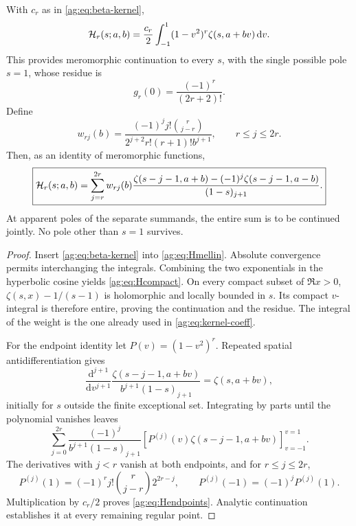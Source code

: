 \begin{theorem}
\label{ag:thm:hurwitz}
With $c_r$ as in \eqref{ag:eq:beta-kernel},
\begin{equation}\label{ag:eq:Hcompact}
 \mathcal H_r(s;a,b)=\frac{c_r}{2}\int_{-1}^1
                    (1-v^2)^r\zeta(s,a+bv)\,\mathrm d v.
\end{equation}
This provides meromorphic continuation to every $s$, with the single
possible pole $s=1$, whose residue is
\begin{equation}\label{ag:eq:Hresidue}
 g_r(0)=\frac{(-1)^r}{(2r+2)!}.
\end{equation}
Define
\begin{equation}\label{ag:eq:weights}
 w_{rj}(b)=\frac{(-1)^j j!\binom r{j-r}}
 {2^{j+2}r!(r+1)!b^{j+1}},\qquad r\le j\le2r.
\end{equation}
Then, as an identity of meromorphic functions,
\begin{equation}\label{ag:eq:Hendpoints}
 \boxed{
 \mathcal H_r(s;a,b)=\sum_{j=r}^{2r}w_{rj}(b)
 \frac{\zeta(s-j-1,a+b)-(-1)^j\zeta(s-j-1,a-b)}{(1-s)_{j+1}}.}
\end{equation}
At apparent poles of the separate summands, the entire sum is to be
continued jointly. No pole other than $s=1$ survives.
\end{theorem}
\begin{proof}
Insert \eqref{ag:eq:beta-kernel} into \eqref{ag:eq:Hmellin}.
Absolute convergence permits interchanging the integrals. Combining
the two exponentials in the hyperbolic cosine yields
\eqref{ag:eq:Hcompact}. On every compact subset of $\Re x>0$,
$\zeta(s,x)-1/(s-1)$ is holomorphic and locally bounded in $s$.
Its compact $v$-integral is therefore entire, proving the continuation
and the residue. The integral of the weight is the one already used
in \eqref{ag:eq:kernel-coeff}.

For the endpoint identity let $P(v)=(1-v^2)^r$. Repeated spatial
antidifferentiation gives
\[
 \frac{\mathrm d^{j+1}}{\mathrm dv^{j+1}}
 \frac{\zeta(s-j-1,a+bv)}{b^{j+1}(1-s)_{j+1}}
 =\zeta(s,a+bv),
\]
initially for $s$ outside the finite exceptional set. Integrating by
parts until the polynomial vanishes leaves
\[
 \sum_{j=0}^{2r}\frac{(-1)^j}{b^{j+1}(1-s)_{j+1}}
       [P^{(j)}(v)\zeta(s-j-1,a+bv)]_{v=-1}^{v=1}.
\]
The derivatives with $j<r$ vanish at both endpoints, and for $r\le j\le2r$,
\begin{equation}\label{ag:eq:weight-derivative}
 P^{(j)}(1)=(-1)^r j!\binom r{j-r}2^{2r-j},\qquad
 P^{(j)}(-1)=(-1)^jP^{(j)}(1).
\end{equation}
Multiplication by $c_r/2$ proves \eqref{ag:eq:Hendpoints}. Analytic
continuation establishes it at every remaining regular point.
\end{proof}

